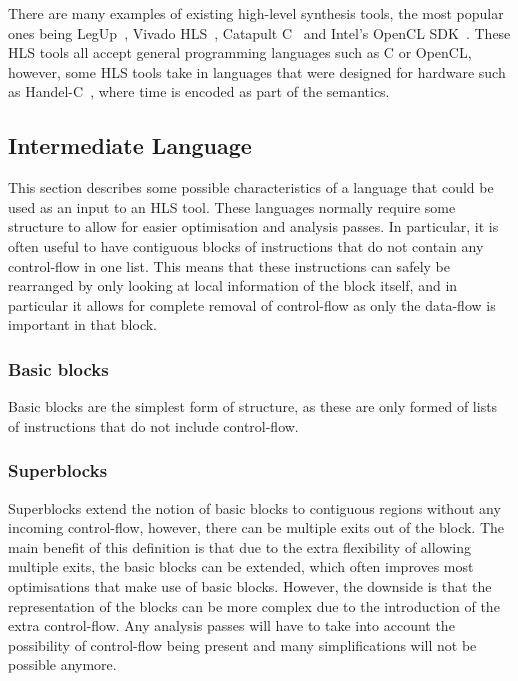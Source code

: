 There are many examples of existing high-level synthesis tools, the most popular
ones being LegUp~\cite{canis13_legup}, Vivado
HLS~\cite{xilinx20_vivad_high_synth}, Catapult
C~\cite{mentor20_catap_high_level_synth} and Intel's OpenCL
SDK~\cite{intel20_sdk_openc_applic}.  These HLS tools all accept general
programming languages such as C or OpenCL, however, some HLS tools take in
languages that were designed for hardware such as
Handel-C~\cite{aubury96_handel_c_languag_refer_guide}, where time is encoded as
part of the semantics.

\subsection{Intermediate Language}%
\label{sec:bg:intermediate-language}

This section describes some possible characteristics of a language that could be
used as an input to an \gls{HLS} tool.  These languages normally require some
structure to allow for easier optimisation and analysis passes.  In particular,
it is often useful to have contiguous blocks of instructions that do not contain
any control-flow in one list.  This means that these instructions can safely be
rearranged by only looking at local information of the block itself, and in
particular it allows for complete removal of control-flow as only the data-flow
is important in that block.

\subsubsection{Basic blocks}


Basic blocks are the simplest form of structure, as these are only formed of
lists of instructions that do not include control-flow.

\subsubsection{Superblocks}

Superblocks extend the notion of basic blocks to contiguous regions without any
incoming control-flow, however, there can be multiple exits out of the block.
The main benefit of this definition is that due to the extra flexibility of
allowing multiple exits, the basic blocks can be extended, which often improves
most optimisations that make use of basic blocks.  However, the downside is that
the representation of the blocks can be more complex due to the introduction of
the extra control-flow.  Any analysis passes will have to take into account the
possibility of control-flow being present and many simplifications will not be
possible anymore.

